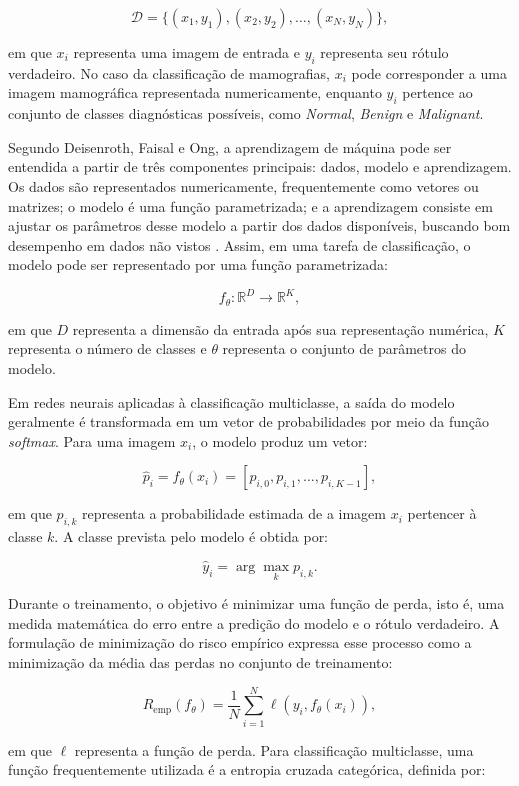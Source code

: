 \documentclass[
    12pt,
    openright,
    oneside,
    a4paper,
    english,
    brazil
]{abntex2}
\begin{document}
\[
\mathcal{D} = \{(x_1,y_1),(x_2,y_2),\ldots,(x_N,y_N)\},
\]

em que \(x_i\) representa uma imagem de entrada e \(y_i\) representa seu rótulo verdadeiro. No caso da classificação de mamografias, \(x_i\) pode corresponder a uma imagem mamográfica representada numericamente, enquanto \(y_i\) pertence ao conjunto de classes diagnósticas possíveis, como \textit{Normal}, \textit{Benign} e \textit{Malignant}.

Segundo Deisenroth, Faisal e Ong, a aprendizagem de máquina pode ser entendida a partir de três componentes principais: dados, modelo e aprendizagem. Os dados são representados numericamente, frequentemente como vetores ou matrizes; o modelo é uma função parametrizada; e a aprendizagem consiste em ajustar os parâmetros desse modelo a partir dos dados disponíveis, buscando bom desempenho em dados não vistos \cite{deisenroth2020mathematics}. Assim, em uma tarefa de classificação, o modelo pode ser representado por uma função parametrizada:

\[
f_{\theta}: \mathbb{R}^{D} \rightarrow \mathbb{R}^{K},
\]

em que \(D\) representa a dimensão da entrada após sua representação numérica, \(K\) representa o número de classes e \(\theta\) representa o conjunto de parâmetros do modelo.

Em redes neurais aplicadas à classificação multiclasse, a saída do modelo geralmente é transformada em um vetor de probabilidades por meio da função \textit{softmax}. Para uma imagem \(x_i\), o modelo produz um vetor:

\[
\hat{p}_i = f_{\theta}(x_i) = [p_{i,0}, p_{i,1}, \ldots, p_{i,K-1}],
\]

em que \(p_{i,k}\) representa a probabilidade estimada de a imagem \(x_i\) pertencer à classe \(k\). A classe prevista pelo modelo é obtida por:

\[
\hat{y}_i = \arg\max_{k} p_{i,k}.
\]

Durante o treinamento, o objetivo é minimizar uma função de perda, isto é, uma medida matemática do erro entre a predição do modelo e o rótulo verdadeiro. A formulação de minimização do risco empírico expressa esse processo como a minimização da média das perdas no conjunto de treinamento:

\[
R_{\text{emp}}(f_{\theta}) =
\frac{1}{N}
\sum_{i=1}^{N}
\ell(y_i, f_{\theta}(x_i)),
\]

em que \(\ell\) representa a função de perda. Para classificação multiclasse, uma função frequentemente utilizada é a entropia cruzada categórica, definida por:
\end{document}
